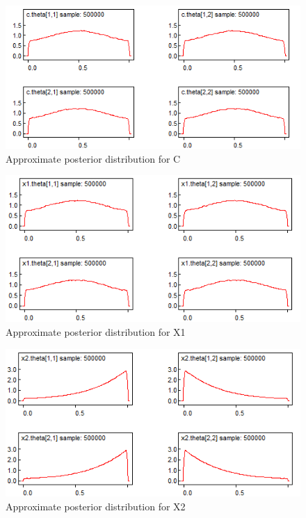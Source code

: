 \documentclass[12pt]{article} %
\begin{document}
\begin{figure}[h!]
  \centering
  \includegraphics[width=\linewidth]{bugs_graphs/c.png}
  \caption{Approximate posterior distribution for C}
  \label{fig:C Posterior}
\end{figure}

\begin{figure}[h!]
  \centering
  \includegraphics[width=\linewidth]{bugs_graphs/x1.png}
  \caption{Approximate posterior distribution for X1}
  \label{fig:X1 Posterior}
\end{figure}

\begin{figure}[h!]
  \centering
  \includegraphics[width=\linewidth]{bugs_graphs/x2.png}
  \caption{Approximate posterior distribution for X2}
  \label{fig:X2 Posterior}
\end{figure}
\end{document}

